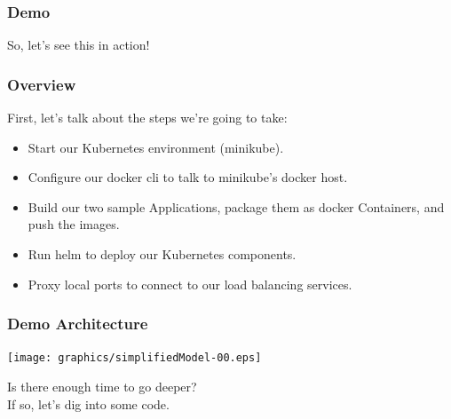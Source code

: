     \begin{frame}
        \frametitle{Demo}
        \begin{center}
            \Huge So, let's see this in action!
        \end{center}
    \end{frame}

    \begin{frame}
        \frametitle{Overview}
        First, let's talk about the steps we're going to take:
        \begin{itemize}
            \item Start our Kubernetes environment (minikube).\pause
            \item Configure our docker cli to talk to minikube's docker host.\pause
            \item Build our two sample Applications, package them as docker Containers, and push the images.\pause
            \item Run helm to deploy our Kubernetes components.\pause
            \item Proxy local ports to connect to our load balancing services.
        \end{itemize}
    \end{frame}

    \begin{frame}
        \frametitle{Demo Architecture}
        \texttt{[image: graphics/simplifiedModel-00.eps]}
    \end{frame}

    \begin{frame}
        \begin{center}
            \Huge Is there enough time to go deeper?\\
            If so, let's dig into some code.
        \end{center}
    \end{frame}

